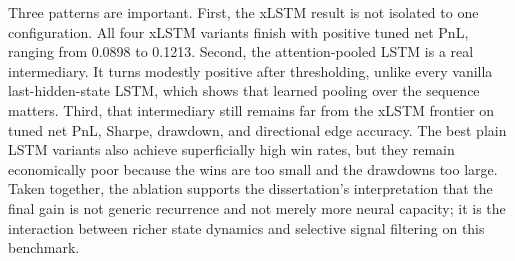 \documentclass[12pt]{report}
\begin{document}
Three patterns are important. First, the xLSTM result is not isolated to one configuration. All four xLSTM variants finish with positive tuned net PnL, ranging from 0.0898 to 0.1213. Second, the attention-pooled LSTM is a real intermediary. It turns modestly positive after thresholding, unlike every vanilla last-hidden-state LSTM, which shows that learned pooling over the sequence matters. Third, that intermediary still remains far from the xLSTM frontier on tuned net PnL, Sharpe, drawdown, and directional edge accuracy. The best plain LSTM variants also achieve superficially high win rates, but they remain economically poor because the wins are too small and the drawdowns too large. Taken together, the ablation supports the dissertation's interpretation that the final gain is not generic recurrence and not merely more neural capacity; it is the interaction between richer state dynamics and selective signal filtering on this benchmark.
\end{document}
